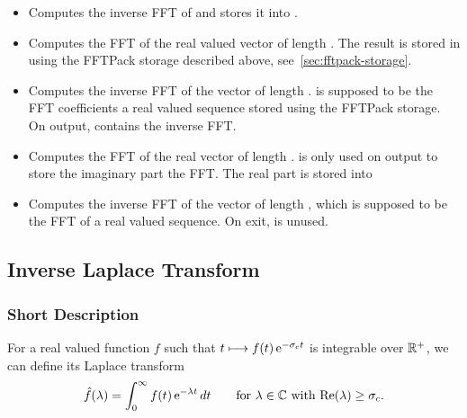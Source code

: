 \begin{itemize}
\item {}
  \sshortdescribe Computes the inverse FFT of  and stores it into .

\item {}
  \sshortdescribe Computes the FFT of the real valued vector  of
  length . The result is stored in  using the FFTPack storage
  described above, see~\ref{sec:fftpack-storage}.

\item {}
  \sshortdescribe Computes the inverse FFT of the vector  of length
  .  is supposed to be the FFT coefficients a real valued
  sequence stored using the FFTPack storage. On output,  contains
  the inverse FFT.

\item {}
  \sshortdescribe Computes the FFT of the real vector  of length .
   is only used on output to store the imaginary part the FFT. The
  real part is stored into 

\item {}
  \sshortdescribe Computes the inverse FFT of the vector  of
  length , which is supposed to be the FFT of a real valued
  sequence. On exit,  is unused.
\end{itemize}

\subsection{Inverse Laplace Transform}
\subsubsection{Short Description}

For a real valued function $f$ such that $t \longmapsto f(t) \operatorname{e}^{ - \sigma_c
  t }$ is integrable over ${\mathbb R}^+$, we can define its Laplace transform
\begin{equation*}
  \hat{f}(\lambda) = \int_0^\infty f(t) \operatorname{e}^{ - \lambda t } dt \qquad
  \mbox{for $\lambda \in {\mathbb C}$ with $\operatorname{Re}(\lambda) \ge \sigma_c$}.
\end{equation*}

